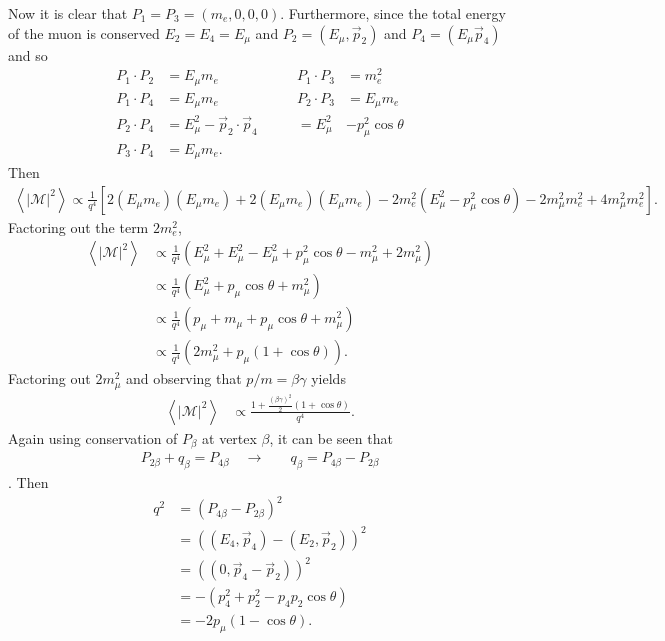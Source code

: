 Now it is clear that $P_1=P_3=(m_e, 0, 0, 0)$. Furthermore, since the total energy of the muon is conserved $E_2 = E_4 = E_\mu$ and $P_2 = (E_\mu, \vec{p}_2)$ and $P_4 = (E_\mu \vec{p}_4)$ and so
\begin{align*}
P_1 \cdot P_2 &= E_\mu m_e &\qquad P_1 \cdot P_3 &= m_e ^2 \\
P_1 \cdot P_4 &= E_\mu m_e &\qquad  P_2 \cdot P_3 &= E_\mu m_e \\
P_2 \cdot P_4 &= E_\mu ^2 - \vec{p}_2 \cdot \vec{p}_4 &\qquad = E_\mu ^2  & - p_\mu ^2 \cos\theta\\
P_3 \cdot P_4 &= E_\mu m_e.
\end{align*}
Then
\begin{align*}
\left< |\mathcal{M}|^2\right> \propto \frac{1}{q^4} [2 (E_\mu m_e)(E_\mu m_e) + 2 (E_\mu m_e) (E_\mu m_e) - 2 m_e ^2 (E_\mu^2 - p_\mu ^2 \cos\theta) - 2 m_\mu ^2 m_e ^2 + 4 m_\mu ^2 m_e ^2 ].
\end{align*}
Factoring out the term $2m_e ^2$, 
\begin{align*}
\left< |\mathcal{M}|^2\right> 
&\propto \frac{1}{q^4} (E_\mu ^2 + E_\mu ^2 - E_\mu ^2 + p_\mu ^2 \cos\theta - m_\mu ^2+ 2 m_\mu ^2 ) \\
&\propto \frac{1}{q^4} (E_\mu ^2 + p_\mu \cos\theta + m_\mu^2)\\
&\propto \frac{1}{q^4} (p_\mu + m_\mu + p_\mu \cos\theta + m_\mu^2)\\
&\propto \frac{1}{q^4} (2 m_\mu ^2 + p_\mu (1+\cos\theta)).
\end{align*}
Factoring out $2m_\mu ^2$ and observing that $p/m = \beta\gamma$ yields
\begin{align*}
\left< |\mathcal{M}|^2\right> 
&\propto \frac{1+\frac{(\beta\gamma)^2}{2} (1+\cos\theta)  }{q^4}.
\end{align*}
Again using conservation of $P_\beta$ at vertex $\beta$, it can be seen that 
\begin{align*}
P_{2\beta}+q_\beta=P_{4\beta} \quad \rightarrow \quad & q_\beta = P_{4\beta} - P_{2\beta}
\end{align*}.
Then
\begin{align*}
q^2 &= ( P_{4\beta} - P_{2\beta}) ^2\\
&= ( (E_4, \vec{p}_4) - (E_2, \vec{p}_2 ) )^2\\
& = ((0, \vec{p}_4 - \vec{p}_2))^2\\
& = - (p_4 ^2 + p_2 ^2 - p_4 p_2 \cos\theta)\\
&=-2p_\mu (1-\cos\theta).
\end{align*}
